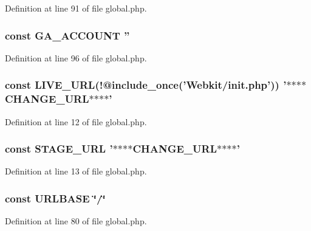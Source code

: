 Definition at line 91 of file global.\-php.

\hypertarget{global_8php_a63584e945f652ffb7392f41c4f013922}{
\subsubsection[{G\-A\-\_\-\-A\-C\-C\-O\-U\-N\-T}]{\setlength{\rightskip}{0pt plus 5cm}const G\-A\-\_\-\-A\-C\-C\-O\-U\-N\-T ''}}\label{global_8php_a63584e945f652ffb7392f41c4f013922}


Definition at line 96 of file global.\-php.

\hypertarget{global_8php_aa55bd7b507e10bb441ac76d99b4c1358}{
\subsubsection[{L\-I\-V\-E\-\_\-\-U\-R\-L}]{\setlength{\rightskip}{0pt plus 5cm}const L\-I\-V\-E\-\_\-\-U\-R\-L(!@include\-\_\-once('Webkit/init.\-php')) '$\ast$$\ast$$\ast$$\ast$C\-H\-A\-N\-G\-E\-\_\-\-U\-R\-L$\ast$$\ast$$\ast$$\ast$'}}\label{global_8php_aa55bd7b507e10bb441ac76d99b4c1358}


Definition at line 12 of file global.\-php.

\hypertarget{global_8php_a9de38c82260effe90ef1caa4d6026973}{
\subsubsection[{S\-T\-A\-G\-E\-\_\-\-U\-R\-L}]{\setlength{\rightskip}{0pt plus 5cm}const S\-T\-A\-G\-E\-\_\-\-U\-R\-L '$\ast$$\ast$$\ast$$\ast$C\-H\-A\-N\-G\-E\-\_\-\-U\-R\-L$\ast$$\ast$$\ast$$\ast$'}}\label{global_8php_a9de38c82260effe90ef1caa4d6026973}


Definition at line 13 of file global.\-php.

\hypertarget{global_8php_a422353d788747ecd47fc7a656e4ebd92}{
\subsubsection[{U\-R\-L\-B\-A\-S\-E}]{\setlength{\rightskip}{0pt plus 5cm}const U\-R\-L\-B\-A\-S\-E \char`\"{}/\char`\"{}}}\label{global_8php_a422353d788747ecd47fc7a656e4ebd92}


Definition at line 80 of file global.\-php.

